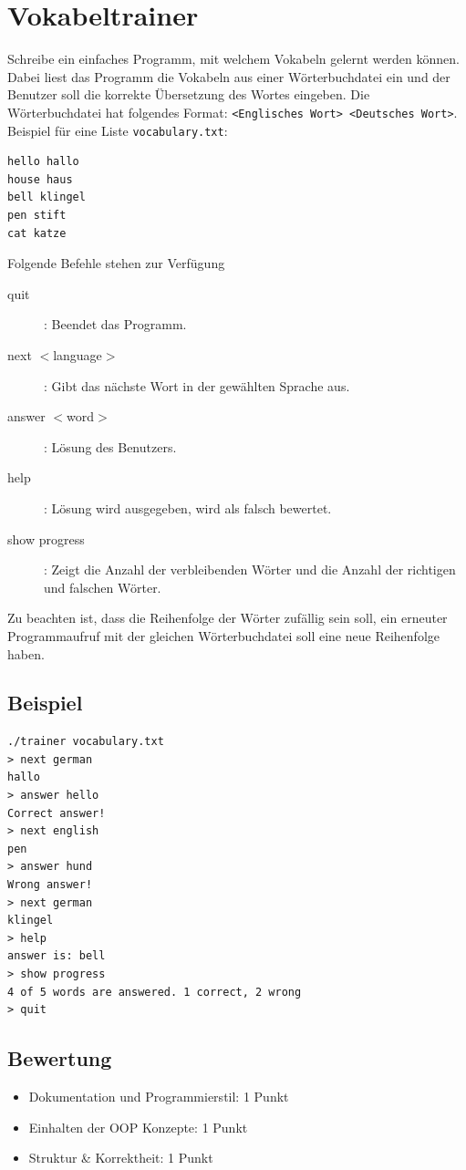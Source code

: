 \documentclass[a4paper,10pt]{article}
\begin{document}
\section*{Vokabeltrainer}

Schreibe ein einfaches Programm, mit welchem Vokabeln gelernt werden können. Dabei liest das Programm die Vokabeln aus einer Wörterbuchdatei ein und der Benutzer soll die korrekte Übersetzung des Wortes eingeben. Die Wörterbuchdatei hat folgendes Format: \texttt{<Englisches Wort> <Deutsches Wort>}.\newline
Beispiel für eine Liste \texttt{vocabulary.txt}:
\begin{lstlisting}[frame=single]
hello hallo
house haus
bell klingel
pen stift
cat katze
\end{lstlisting}

Folgende Befehle stehen zur Verfügung
\begin{description}
 \item[quit]: Beendet das Programm.
 \item[next $<$language$>$]: Gibt das nächste Wort in der gewählten Sprache aus.
 \item[answer $<$word$>$]: Lösung des Benutzers.
 \item[help]: Lösung wird ausgegeben, wird als falsch bewertet.
 \item[show progress]: Zeigt die Anzahl der verbleibenden Wörter und die Anzahl der richtigen und falschen Wörter.
\end{description}
Zu beachten ist, dass die Reihenfolge der Wörter zufällig sein soll, ein erneuter Programmaufruf mit der gleichen Wörterbuchdatei soll eine neue Reihenfolge haben.

\subsection*{Beispiel}
\footnotesize
\begin{verbatim}
./trainer vocabulary.txt
> next german
hallo
> answer hello
Correct answer!
> next english
pen
> answer hund
Wrong answer!
> next german
klingel
> help
answer is: bell
> show progress
4 of 5 words are answered. 1 correct, 2 wrong
> quit
\end{verbatim}

\subsection*{Bewertung}
\begin{itemize}
 \item Dokumentation und Programmierstil: 1 Punkt
 \item Einhalten der OOP Konzepte: 1 Punkt
 \item Struktur \& Korrektheit: 1 Punkt
\end{itemize}
\newpage
\end{document}
